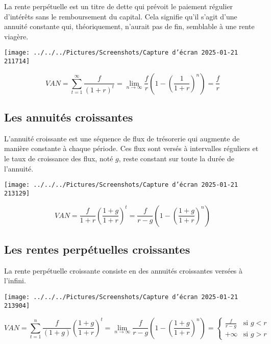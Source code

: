 \documentclass[a4paper, 12pt]{report}
\begin{document}
La rente perpétuelle est un titre de dette qui prévoit le paiement régulier d'intérêts sans le remboursement du capital. Cela signifie qu'il s'agit d'une annuité constante qui, théoriquement, n'aurait pas de fin, semblable à une rente viagère.

\begin{center}
	\texttt{[image: ../../../Pictures/Screenshots/Capture d'écran 2025-01-21 211714]}
\end{center}

\[ VAN =\sum_{t=1}^{\infty}\frac{f}{(1+r)^t}= \lim_{n\rightarrow \infty}\frac{f}{r}\left( 1-\left( \frac{1}{1+r}\right) ^n\right)=\frac{f}{r} \]

\subsection{Les annuités croissantes}

L'annuité croissante est une séquence de flux de trésorerie qui augmente de manière constante à chaque période. Ces flux sont versés à intervalles réguliers et le taux de croissance des flux, noté \( g \), reste constant sur toute la durée de l'annuité.

\begin{center}
\texttt{[image: ../../../Pictures/Screenshots/Capture d'écran 2025-01-21 213129]}
\end{center}

\[ VAN = \frac{f}{1+r}\left( \frac{1+g}{1+r} \right)^t=\frac{f}{r-g}\left( 1-\left( \frac{1+g}{1+r} \right)^n \right) \]

\subsection{Les rentes perpétuelles croissantes}

La rente perpétuelle croissante consiste en des annuités croissantes versées à l'infini.

\begin{center}
\texttt{[image: ../../../Pictures/Screenshots/Capture d'écran 2025-01-21 213904]}
\end{center}

\[
VAN = \sum_{t=1}^{n} \frac{f}{(1+g)} \left( \frac{1+g}{1+r} \right)^{t} = \lim_{n \to \infty} \frac{f}{r-g} \left( 1 - \left( \frac{1+g}{1+r} \right)^{n} \right) = \begin{cases} 
	\frac{f}{r-g} & \text{si } g < r \\ 
	+\infty & \text{si } g > r 
\end{cases}
\]
\end{document}
